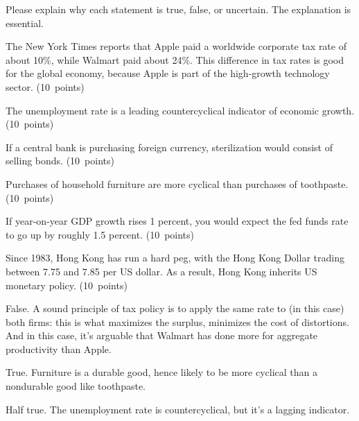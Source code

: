 \documentclass[letterpaper,12pt]{exam}
\begin{document}
\begin{questions}
\begin{solution}
\begin{parts}
\end{parts}
\end{solution}


Please explain why each statement is true, false, or uncertain.
The explanation is essential.
%
\begin{parts}
\item The New York Times reports that Apple paid a worldwide corporate
tax rate of about 10\%, while Walmart paid about 24\%.
This difference in tax rates is good for the global economy,
because Apple is part of the high-growth technology sector.
(10~points)

\item The unemployment rate is a leading countercyclical indicator
of economic growth.
(10~points)

\item If a central bank is purchasing foreign currency,
sterilization would consist of selling bonds.
(10~points)

\item Purchases of household furniture are more cyclical
than purchases of toothpaste.
(10~points)

\item If year-on-year GDP growth rises 1 percent, you
would expect the fed funds rate to go up by roughly 1.5 percent.
(10~points)

\item Since 1983, Hong Kong has run a hard peg, with
the Hong Kong Dollar trading between 7.75 and 7.85 per US dollar.
As a result, Hong Kong inherits US monetary policy.
(10~points)
\end{parts}

\begin{solution}
\begin{parts}
\item False.  A sound principle of tax policy is to apply the same rate
to (in this case) both firms:  this is what maximizes the surplus,
minimizes the cost of distortions.
And in this case, it's arguable that Walmart has done more for aggregate
productivity than Apple.

\item True.  Furniture is a durable good, hence likely to be more cyclical
than a nondurable good like toothpaste.

\item Half true.  The unemployment rate is countercyclical,
but it's a lagging indicator.


\end{parts}
\end{solution}
\end{questions}
\end{document}
